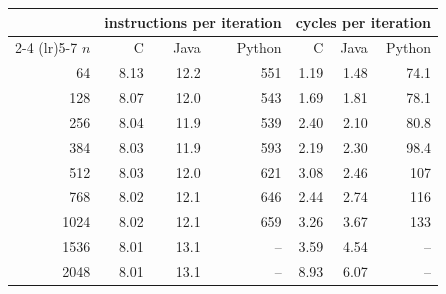 \begin{tabular}{rrrrrrr}
\toprule
 & \multicolumn{3}{c}{instructions per iteration} & \multicolumn{3}{c}{cycles per iteration} \\ \cmidrule(lr){2-4} \cmidrule(lr){5-7} $n$ & C & Java & Python & C & Java & Python \\
\midrule
64 & 8.13 & 12.2 & 551 & 1.19 & 1.48 & 74.1 \\
128 & 8.07 & 12.0 & 543 & 1.69 & 1.81 & 78.1 \\
256 & 8.04 & 11.9 & 539 & 2.40 & 2.10 & 80.8 \\
384 & 8.03 & 11.9 & 593 & 2.19 & 2.30 & 98.4 \\
512 & 8.03 & 12.0 & 621 & 3.08 & 2.46 & 107 \\
768 & 8.02 & 12.1 & 646 & 2.44 & 2.74 & 116 \\
1024 & 8.02 & 12.1 & 659 & 3.26 & 3.67 & 133 \\
1536 & 8.01 & 13.1 & -- & 3.59 & 4.54 & -- \\
2048 & 8.01 & 13.1 & -- & 8.93 & 6.07 & -- \\
\bottomrule
\end{tabular}

